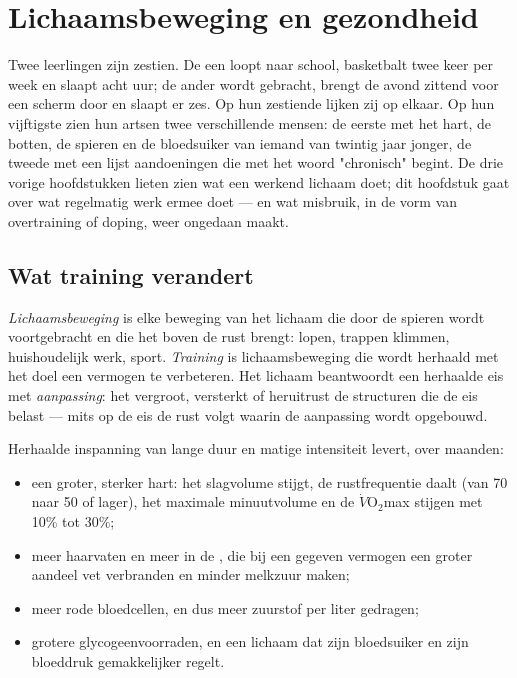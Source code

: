 \chapter{Lichaamsbeweging en gezondheid}\label{ch:g10:sport-and-health}

Twee leerlingen zijn zestien. De een loopt naar school, basketbalt twee
keer per week en slaapt acht uur; de ander wordt gebracht, brengt de
avond zittend voor een scherm door en slaapt er zes. Op hun zestiende
lijken zij op elkaar. Op hun vijftigste zien hun artsen twee
verschillende mensen: de eerste met het hart, de botten, de spieren en de
bloedsuiker van iemand van twintig jaar jonger, de tweede met een lijst
aandoeningen die met het woord "chronisch" begint. De drie vorige
hoofdstukken lieten zien wat een werkend lichaam doet; dit hoofdstuk gaat
over wat regelmatig werk ermee doet --- en wat misbruik, in de vorm van
overtraining of doping, weer ongedaan maakt.

\section{Wat training verandert}

\begin{definition}\label{def:g10:sport-and-health:training}
\emph{Lichaamsbeweging} is elke beweging van het
lichaam die door de spieren wordt voortgebracht en die het
 boven de rust brengt: lopen, trappen klimmen,
huishoudelijk werk, sport. \emph{Training} is lichaamsbeweging die wordt
herhaald met het doel een vermogen te verbeteren. Het lichaam beantwoordt
een herhaalde eis met \emph{aanpassing}: het vergroot, versterkt of
heruitrust de structuren die de eis belast --- mits op de eis de rust
volgt waarin de aanpassing wordt opgebouwd.
\end{definition}

\begin{proposition}\label{prop:g10:sport-and-health:endurance}
Herhaalde inspanning van lange duur en matige intensiteit levert, over
maanden:
\begin{itemize}
  \item een groter, sterker hart: het slagvolume stijgt, de
        rustfrequentie daalt (van 70 naar 50 of lager), het maximale
        minuutvolume en de $\dot V\!\mathrm{O_2}$max stijgen met 10\% tot
        30\%;
  \item meer haarvaten en meer  in de , die bij
        een gegeven vermogen een groter aandeel vet verbranden en minder
        melkzuur maken;
  \item meer rode bloedcellen, en dus meer zuurstof per liter gedragen;
  \item grotere glycogeenvoorraden, en een lichaam dat zijn bloedsuiker
        en zijn bloeddruk gemakkelijker regelt.
\end{itemize}
\end{proposition}
\admitted

